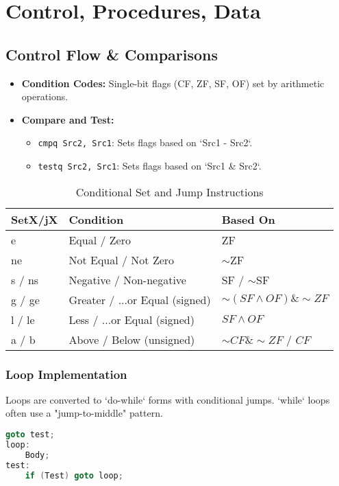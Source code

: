 \documentclass[10pt, twocolumn]{article}
\begin{document}
\section*{Control, Procedures, Data}

\subsection*{Control Flow \& Comparisons}
\begin{itemize}
    \item \textbf{Condition Codes:} Single-bit flags (CF, ZF, SF, OF) set by arithmetic operations.
    \item \textbf{Compare and Test:}
    \begin{itemize}
        \item \texttt{cmpq Src2, Src1}: Sets flags based on `Src1 - Src2`.
        \item \texttt{testq Src2, Src1}: Sets flags based on `Src1 & Src2`.
    \end{itemize}
\end{itemize}
\begin{table}[h]
    \caption{Conditional Set and Jump Instructions}
    \scriptsize
    \begin{tabular}{lll}
        \toprule
        \textbf{SetX/jX} & \textbf{Condition} & \textbf{Based On} \\
        \midrule
        e & Equal / Zero & ZF \\
        ne & Not Equal / Not Zero & $\sim$ZF \\
        s / ns & Negative / Non-negative & SF / $\sim$SF \\
        g / ge & Greater / ...or Equal (signed) & $\sim(SF\wedge OF)\& \sim ZF$ \\
        l / le & Less / ...or Equal (signed) & $SF\wedge OF$ \\
        a / b & Above / Below (unsigned) & $\sim CF\& \sim ZF$ / $CF$ \\
        \bottomrule
    \end{tabular}
\end{table}

\subsubsection*{Loop Implementation}
Loops are converted to `do-while` forms with conditional jumps. `while` loops often use a "jump-to-middle" pattern.
\begin{lstlisting}[language=c, basicstyle=\ttfamily\tiny, caption=While-loop translation]
goto test;
loop:
    Body;
test:
    if (Test) goto loop;
\end{lstlisting}
\end{document}
